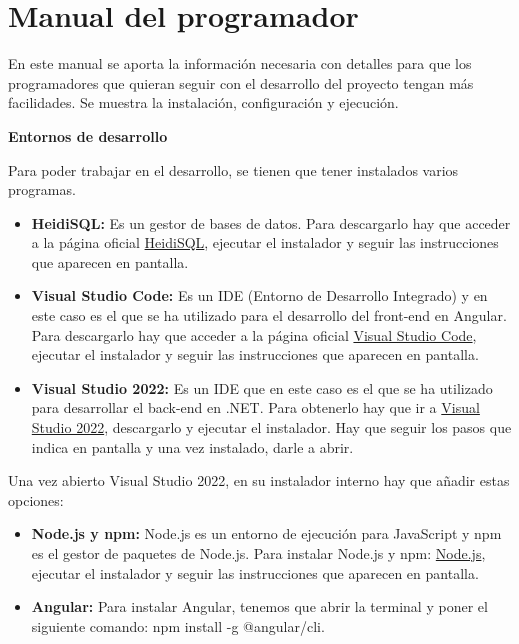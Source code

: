 \section{Manual del programador}

En este manual se aporta la información necesaria con detalles para que los programadores que quieran seguir con el desarrollo del proyecto tengan más facilidades. Se muestra la instalación, configuración y ejecución.

\textbf{Entornos de desarrollo}

Para poder trabajar en el desarrollo, se tienen que tener instalados varios programas.

\begin{itemize}
\tightlist
    \item 
    \textbf{HeidiSQL:} Es un gestor de bases de datos. Para descargarlo hay que acceder a la página oficial \href{https://www.heidisql.com/}{HeidiSQL}, ejecutar el instalador y seguir las instrucciones que aparecen en pantalla.
    \item 
    \textbf{Visual Studio Code:} Es un IDE (Entorno de Desarrollo Integrado) y en este caso es el que se ha utilizado para el desarrollo del front-end en Angular. Para descargarlo hay que acceder a la página oficial \href{https://code.visualstudio.com/}{Visual Studio Code}, ejecutar el instalador y seguir las instrucciones que aparecen en pantalla.
    \item 
    \textbf{Visual Studio 2022:} Es un IDE que en este caso es el que se ha utilizado para desarrollar el back-end en .NET. Para obtenerlo hay que ir a \href{https://visualstudio.microsoft.com/es/vs/}{Visual Studio 2022}, descargarlo y ejecutar el instalador. Hay que seguir los pasos que indica en pantalla y una vez instalado, darle a abrir.
\end{itemize}

Una vez abierto Visual Studio 2022, en su instalador interno hay que añadir estas opciones:




\begin{itemize}
\tightlist
    \item 
    \textbf{Node.js y npm:} Node.js es un entorno de ejecución para JavaScript y npm es el gestor de paquetes de Node.js. Para instalar Node.js y npm: \href{https://nodejs.org/es}{Node.js}, ejecutar el instalador y seguir las instrucciones que aparecen en pantalla.
    \item 
    \textbf{Angular:} Para instalar Angular, tenemos que abrir la terminal y poner el siguiente comando: npm install -g @angular/cli.
\end{itemize}

